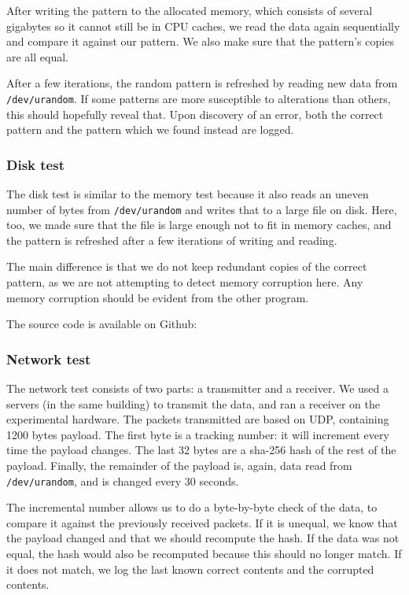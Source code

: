 \documentclass[conference]{IEEEtran}
\begin{document}
After writing the pattern to the allocated memory, which consists of several
gigabytes so it cannot still be in CPU caches, we read the data again
sequentially and compare it against our pattern. We also make sure that the
pattern's copies are all equal.

After a few iterations, the random pattern is refreshed by reading new data
from \texttt{/dev/urandom}. If some patterns are more susceptible to
alterations than others, this should hopefully reveal that. Upon discovery of
an error, both the correct pattern and the pattern which we found instead are
logged.

\subsubsection{Disk test}

The disk test is similar to the memory test because it also reads an uneven
number of bytes from \texttt{/dev/urandom} and writes that to a large file on
disk. Here, too, we made sure that the file is large enough not to fit in
memory caches, and the pattern is refreshed after a few iterations of writing
and reading.

The main difference is that we do not keep redundant copies of the correct
pattern, as we are not attempting to detect memory corruption here. Any memory
corruption should be evident from the other program.

The source code is available on Github: %

\subsubsection{Network test}

The network test consists of two parts: a transmitter and a receiver. We used a
servers (in the same building) to transmit the data, and ran a receiver on the
experimental hardware. The packets transmitted are based on UDP, containing
1200 bytes payload. The first byte is a tracking number: it will increment
every time the payload changes. The last 32 bytes are a sha-256 hash of the
rest of the payload. Finally, the remainder of the payload is, again, data read
from \texttt{/dev/urandom}, and is changed every 30 seconds.

The incremental number allows us to do a byte-by-byte check of the data, to
compare it against the previously received packets. If it is unequal, we know
that the payload changed and that we should recompute the hash. If the data was
not equal, the hash would also be recomputed because this should no longer
match. If it does not match, we log the last known correct contents and the
corrupted contents.
\end{document}
